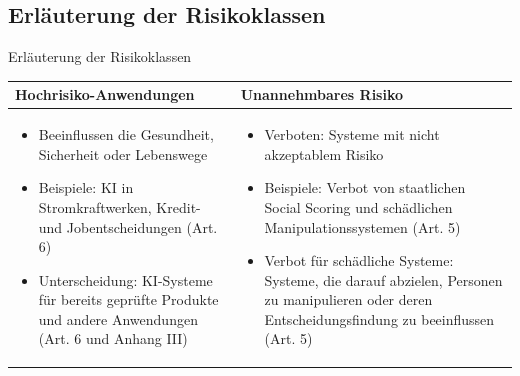 \documentclass[aspectratio=169,16pt,xcolor=table]{beamer}
\begin{document}
\subsection{Erläuterung der Risikoklassen}
\begin{frame}{Erläuterung der Risikoklassen}
  \begin{table}
      \centering
      \begin{tabular}{|p{6.5cm}|p{6.5cm}|}
          \hline
          \textbf{\footnotesize Hochrisiko-Anwendungen} & \textbf{\footnotesize Unannehmbares Risiko} \\
          \hline
          \begin{itemize}
              \item \scriptsize Beeinflussen die Gesundheit, Sicherheit oder Lebenswege 
              \item \scriptsize Beispiele: KI in Stromkraftwerken, Kredit- und Jobentscheidungen (Art. 6)
              \item \scriptsize Unterscheidung: KI-Systeme für bereits geprüfte Produkte und andere Anwendungen (Art. 6 und Anhang III)
          \end{itemize}
          & 
          \begin{itemize}
              \item \scriptsize Verboten: Systeme mit nicht akzeptablem Risiko 
              \item \scriptsize Beispiele: Verbot von staatlichen Social Scoring und schädlichen Manipulationssystemen (Art. 5) 
              \item \scriptsize Verbot für schädliche Systeme: Systeme, die darauf abzielen, Personen zu manipulieren oder deren Entscheidungsfindung zu beeinflussen (Art. 5)
          \end{itemize} \\
          \hline
      \end{tabular}
  \end{table}
\end{frame}

\end{document}
